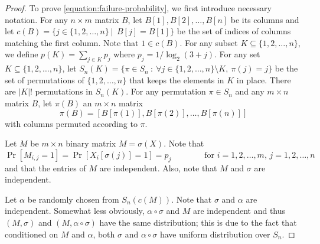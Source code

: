 \documentclass[10pt]{article}
\begin{document}
\begin{proof}
To prove \eqref{equation:failure-probability}, we first introduce necessary
notation. For any $n \times m$ matrix $B$, let $B[1], B[2], \dots, B[n]$ be its
columns and let $c(B) = \{ j \in \{1,2,\dots, n\} ~|~ \ B[j] = B[1] \}$ be the set
of indices of columns matching the first column. Note that $1 \in c(B)$. For any
subset $K \subseteq \{1,2,\dots,n\}$, we define $p(K) = \sum_{j \in K} p_j$
where $p_j = 1/\log_2(3 + j)$. For any set $K \subseteq \{1,2,\dots,n\}$, let
$S_n(K) = \{ \pi \in S_n ~:~ \forall j \in \{1,2,\dots,n\} \setminus K, \ \pi(j) =
j \}$ be the set of permutations of $\{1,2,\dots,n\}$ that keeps the elements in
$K$ in place. There are $|K|!$ permutations in $S_n(K)$. For any permutation $\pi \in S_n$
and any $m \times n$ matrix $B$, let $\pi(B)$ an $m \times n$ matrix
$$
\pi(B) = \left[ B[\pi(1)], B[\pi(2)], \dots, B[\pi(n)] \right]
$$
with columns permuted according to $\pi$.

Let $M$ be $m \times n$ binary matrix $M = \sigma(X)$. Note that
$$
\Pr[M_{i,j} = 1] = \Pr[X_i[\sigma(j)] = 1] = p_j \qquad \qquad \text{for $i=1,2,\dots,m$, \ $j=1,2,\dots,n$}
$$
and that the entries of $M$ are independent. Also, note that $M$ and $\sigma$
are independent.

Let $\alpha$ be randomly chosen from $S_n(c(M))$. Note that $\sigma$ and
$\alpha$ are independent. Somewhat less obviously, $\alpha \circ \sigma$ and $M$
are independent and thus $(M,\sigma)$ and $(M, \alpha \circ \sigma)$ have the
same distribution; this is due to the fact that conditioned on $M$ and $\alpha$,
both $\sigma$ and $\alpha \circ \sigma$ have uniform distribution over $S_n$.


\end{proof}
\end{document}
